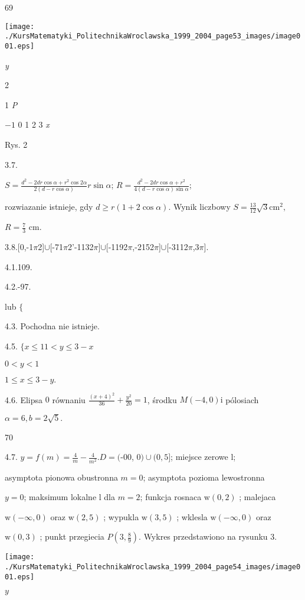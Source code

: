 \documentclass[a4paper,12pt]{article}
\begin{document}
69
\begin{center}
\texttt{[image: ./KursMatematyki\_PolitechnikaWroclawska\_1999\_2004\_page53\_images/image001.eps]}
\end{center}
{\it y}

2

1  {\it P}

$-1$  0 1  2  3 {\it x}

Rys. 2

3.7.

$S = \displaystyle \frac{d^{2}-2dr\cos\alpha+r^{2}\cos 2\alpha}{2(d-r\cos\alpha)}r\sin\alpha$; $R = \displaystyle \frac{d^{2}-2dr\cos\alpha+r^{2}}{4(d-r\cos\alpha)\sin\alpha}$;

rozwiazanie istnieje, gdy $d\geq r(1+2\cos\alpha)$. Wynik liczbowy $S=\displaystyle \frac{13}{12}\sqrt{3}\mathrm{c}\mathrm{m}^{2},$

$R=\displaystyle \frac{7}{3}$ cm.

3.8.[0,-1$\pi$2]$\cup$[-71$\pi$2'-1132$\pi$]$\cup$[-1192$\pi$,-2152$\pi$]$\cup$[-3112$\pi$,3$\pi$].

4.1.109.

4.2.-97.

lub $\{$

4.3. Pochodna nie istnieje.

4.5. $\{x\leq 11<y\leq 3-x$

$0<y<1$

$1\leq x\leq 3-y.$

4.6. Elipsa $0$ równaniu $\displaystyle \frac{(x+4)^{2}}{36}+\frac{y^{2}}{20}=1$, środku $M(-4,0)\mathrm{i}$ pólosiach

$\alpha=6, b=2\sqrt{5}.$





70

4.7. $y = f(m) = \displaystyle \frac{4}{m}-\frac{4}{m^{2}}. D = ($-00, $0)\cup(0,5]$; miejsce zerowe l;

asymptota pionowa obustronna $m = 0$; asymptota pozioma lewostronna

$y=0$; maksimum lokalne l dla $m=2$; funkcja rosnaca $\mathrm{w} (0,2)$ ; malejaca

$\mathrm{w} (-\infty,0)$ oraz $\mathrm{w} (2,5)$ ; wypukla $\mathrm{w} (3,5)$ ; wklesla $\mathrm{w} (-\infty,0)$ oraz

$\mathrm{w}(0,3)$ ; punkt przegiecia $P(3,\displaystyle \frac{8}{9})$. Wykres przedstawiono na rysunku 3.
\begin{center}
\texttt{[image: ./KursMatematyki\_PolitechnikaWroclawska\_1999\_2004\_page54\_images/image001.eps]}
\end{center}
$y$
\end{document}
